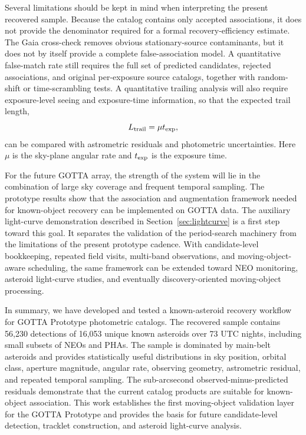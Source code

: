 \documentclass[referee]{raa}
\begin{document}
Several limitations should be kept in mind when interpreting the present recovered sample. Because the catalog contains only accepted associations, it does not provide the denominator required for a formal recovery-efficiency estimate. The Gaia cross-check removes obvious stationary-source contaminants, but it does not by itself provide a complete false-association model. A quantitative false-match rate still requires the full set of predicted candidates, rejected associations, and original per-exposure source catalogs, together with random-shift or time-scrambling tests. A quantitative trailing analysis will also require exposure-level seeing and exposure-time information, so that the expected trail length,
\begin{equation}
L_{\rm trail}=\mu t_{\rm exp},
\end{equation}
can be compared with astrometric residuals and photometric uncertainties. Here $\mu$ is the sky-plane angular rate and $t_{\rm exp}$ is the exposure time.

For the future GOTTA array, the strength of the system will lie in the combination of large sky coverage and frequent temporal sampling. The prototype results show that the association and augmentation framework needed for known-object recovery can be implemented on GOTTA data. The auxiliary light-curve demonstration described in Section~\ref{sec:lightcurve} is a first step toward this goal. It separates the validation of the period-search machinery from the limitations of the present prototype cadence. With candidate-level bookkeeping, repeated field visits, multi-band observations, and moving-object-aware scheduling, the same framework can be extended toward NEO monitoring, asteroid light-curve studies, and eventually discovery-oriented moving-object processing.

In summary, we have developed and tested a known-asteroid recovery workflow for GOTTA Prototype photometric catalogs. The recovered sample contains 56,230 detections of 16,053 unique known asteroids over 73 UTC nights, including small subsets of NEOs and PHAs. The sample is dominated by main-belt asteroids and provides statistically useful distributions in sky position, orbital class, aperture magnitude, angular rate, observing geometry, astrometric residual, and repeated temporal sampling. The sub-arcsecond observed-minus-predicted residuals demonstrate that the current catalog products are suitable for known-object association. This work establishes the first moving-object validation layer for the GOTTA Prototype and provides the basis for future candidate-level detection, tracklet construction, and asteroid light-curve analysis.
\end{document}

